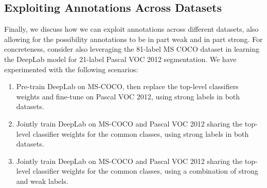 \subsection{Exploiting Annotations Across Datasets}

Finally, we discuss how we can exploit annotations across different
datasets, also allowing for the possibility annotations to be in part
weak and in part strong. For concreteness, consider also leveraging
the 81-label MS COCO dataset in learning the DeepLab model for
21-label Pascal VOC 2012 segmentation. We have experimented with the
following scenarios:
\begin{enumerate}
\item Pre-train DeepLab on MS-COCO, then replace the top-level
  classifiers weights and fine-tune on Pascal VOC 2012, using strong
  labels in both datasets.
\item Jointly train DeepLab on MS-COCO and Pascal VOC 2012 sharing
  the top-level classifier weights for the common classes, using
  strong labels in both datasets.
\item Jointly train DeepLab on MS-COCO and Pascal VOC 2012 sharing
  the top-level classifier weights for the common classes, using a
  combination of strong and weak labels.
\end{enumerate}

